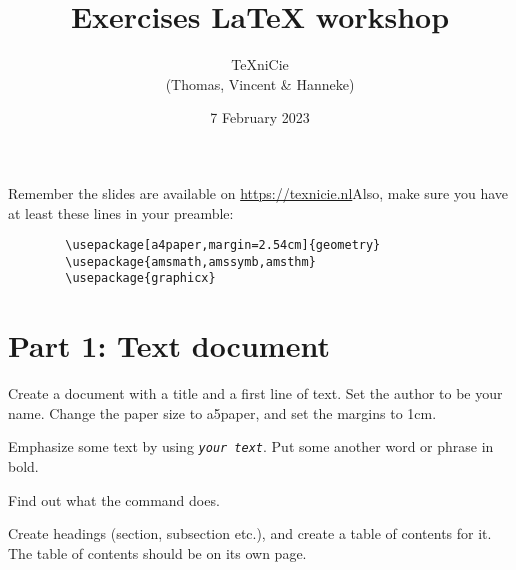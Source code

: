 \documentclass[a4paper]{article}
\title{\vspace{-65pt} Exercises LaTeX workshop}
\author{\TeX niCie\\
{\small (Thomas, Vincent \& Hanneke)}
}
\date{7 February 2023}
\begin{document}
\maketitle


Remember the slides are available on \url{https://texnicie.nl}\quad Also, make sure you have at least these lines in your preamble:
\begin{verbatim}
        \usepackage[a4paper,margin=2.54cm]{geometry}
        \usepackage{amsmath,amssymb,amsthm}
        \usepackage{graphicx}
    \end{verbatim}

\section{Part 1: Text document}

\begin{exercise}
    Create a document with a title and a first line of text. Set the author to
    be your name. Change the paper size to a5paper, and set the margins to 1cm.
\end{exercise}

\begin{exercise}[emphasize]
    Emphasize some text by using \texttt{\emph{your text}}. Put some another word
    or phrase in bold.
    
\end{exercise}

\begin{exercise}[flushright]
    Find out what the \texttt{\flushright} command does.
\end{exercise}

\begin{exercise}[headings]
    Create headings (section, subsection etc.), and create
    a table of contents for it. The table of contents should be on its own page.
\end{exercise}
\end{document}
